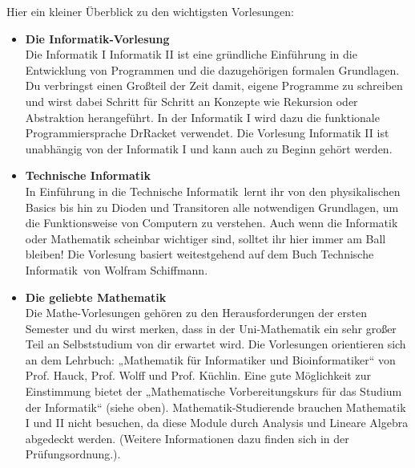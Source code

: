 \ifbachelor
{}
Hier ein kleiner Überblick zu den wichtigsten Vorlesungen:
\begin{itemize}
	\item 
	\textbf{Die Informatik-Vorlesung} \\
	Die 
	\ifwintersemester Informatik I \fi
	\ifsommersemester Informatik II \fi 
	ist eine gründliche Einführung in die Entwicklung von Programmen und die dazugehörigen formalen Grundlagen. 
	Du verbringst einen Großteil der Zeit damit, eigene Programme zu schreiben und wirst dabei Schritt für Schritt 
	an Konzepte wie Rekursion oder Abstraktion herangeführt. 
	\ifwintersemester In der Informatik I wird dazu die funktionale Programmiersprache DrRacket verwendet. \fi
	\ifsommersemester Die Vorlesung Informatik II ist unabhängig von der Informatik I und kann auch zu Beginn gehört werden. \fi
	
	\ifinfo
	\ifwintersemester
	\item 
	\textbf{Technische Informatik} \\
	In \glqq Einführung in die Technische Informatik\grqq \ lernt ihr von den physikalischen Basics bis hin zu Dioden und Transitoren alle notwendigen Grundlagen, um die Funktionsweise von Computern zu verstehen. Auch wenn die Informatik oder Mathematik scheinbar wichtiger sind, solltet ihr hier immer am Ball bleiben! Die Vorlesung basiert weitestgehend auf dem Buch \glqq Technische Informatik\grqq \ von Wolfram Schiffmann.
	\fi
	\fi
	
	\item 
	\textbf{Die geliebte Mathematik} \\
	Die Mathe-Vorlesungen gehören zu den Herausforderungen der ersten Semester und du wirst merken, dass in der Uni-Mathematik ein sehr großer Teil an Selbststudium von dir erwartet wird. Die Vorlesungen orientieren sich an dem Lehrbuch: „Mathematik für Informatiker und Bioinformatiker“ von Prof. Hauck, Prof. Wolff und Prof. Küchlin. Eine gute Möglichkeit zur Einstimmung bietet der „Mathematische Vorbereitungskurs für das Studium der Informatik“ (siehe oben). 
	\iflehramt
	Mathematik-Studierende brauchen Mathematik I
	und II nicht besuchen, da diese Module durch Analysis und Lineare Algebra
	abgedeckt werden. (Weitere Informationen dazu finden sich in der Prüfungsordnung.).
	\fi
\end{itemize}
\fi
